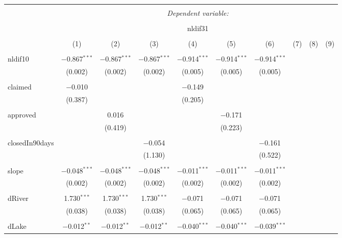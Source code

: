 \documentclass{article}
\begin{document}
\begin{table}[!htbp] \centering 
  \caption{} 
  \label{} 
\begin{tabular}{@{\extracolsep{5pt}}lccccccccc} 
\\[-1.8ex]\hline 
\hline \\[-1.8ex] 
 & \multicolumn{9}{c}{\textit{Dependent variable:}} \\ 
\cline{2-10} 
\\[-1.8ex] & \multicolumn{9}{c}{nldif31} \\ 
\\[-1.8ex] & (1) & (2) & (3) & (4) & (5) & (6) & (7) & (8) & (9)\\ 
\hline \\[-1.8ex] 
 nldif10 & $-$0.867$^{***}$ & $-$0.867$^{***}$ & $-$0.867$^{***}$ & $-$0.914$^{***}$ & $-$0.914$^{***}$ & $-$0.914$^{***}$ &  &  &  \\ 
  & (0.002) & (0.002) & (0.002) & (0.005) & (0.005) & (0.005) &  &  &  \\ 
  & & & & & & & & & \\ 
 claimed & $-$0.010 &  &  & $-$0.149 &  &  &  &  &  \\ 
  & (0.387) &  &  & (0.205) &  &  &  &  &  \\ 
  & & & & & & & & & \\ 
 approved &  & 0.016 &  &  & $-$0.171 &  &  &  &  \\ 
  &  & (0.419) &  &  & (0.223) &  &  &  &  \\ 
  & & & & & & & & & \\ 
 closedIn90days &  &  & $-$0.054 &  &  & $-$0.161 &  &  &  \\ 
  &  &  & (1.130) &  &  & (0.522) &  &  &  \\ 
  & & & & & & & & & \\ 
 slope & $-$0.048$^{***}$ & $-$0.048$^{***}$ & $-$0.048$^{***}$ & $-$0.011$^{***}$ & $-$0.011$^{***}$ & $-$0.011$^{***}$ &  &  &  \\ 
  & (0.002) & (0.002) & (0.002) & (0.002) & (0.002) & (0.002) &  &  &  \\ 
  & & & & & & & & & \\ 
 dRiver & 1.730$^{***}$ & 1.730$^{***}$ & 1.730$^{***}$ & $-$0.071 & $-$0.071 & $-$0.071 &  &  &  \\ 
  & (0.038) & (0.038) & (0.038) & (0.065) & (0.065) & (0.065) &  &  &  \\ 
  & & & & & & & & & \\ 
 dLake & $-$0.012$^{**}$ & $-$0.012$^{**}$ & $-$0.012$^{**}$ & $-$0.040$^{***}$ & $-$0.040$^{***}$ & $-$0.039$^{***}$ &  &  &  \\ 

\end{tabular}
\end{table}
\end{document}

